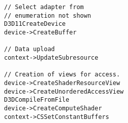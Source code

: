 \lstset{language=C++}
\begin{lstlisting}
// Select adapter from
// enumeration not shown
D3D11CreateDevice
device->CreateBuffer

// Data upload
context->UpdateSubresource

// Creation of views for access.
device->CreateShaderResourceView
device->CreateUnorderedAccessView
D3DCompileFromFile
device->CreateComputeShader
context->CSSetConstantBuffers
\end{lstlisting}